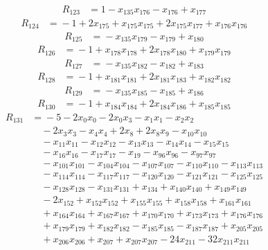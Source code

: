 \begin{align*}
R_{123}&={}1 -x_{135}x_{176} -x_{176} +x_{177}
\end{align*}
\begin{align*}
R_{124}&={}-1 +2x_{175} +x_{175}x_{175} +2x_{175}x_{177} +x_{176}x_{176}
\end{align*}
\begin{align*}
R_{125}&={}-x_{135}x_{179} -x_{179} +x_{180}
\end{align*}
\begin{align*}
R_{126}&={}-1 +x_{178}x_{178} +2x_{178}x_{180} +x_{179}x_{179}
\end{align*}
\begin{align*}
R_{127}&={}-x_{135}x_{182} -x_{182} +x_{183}
\end{align*}
\begin{align*}
R_{128}&={}-1 +x_{181}x_{181} +2x_{181}x_{183} +x_{182}x_{182}
\end{align*}
\begin{align*}
R_{129}&={}-x_{135}x_{185} -x_{185} +x_{186}
\end{align*}
\begin{align*}
R_{130}&={}-1 +x_{184}x_{184} +2x_{184}x_{186} +x_{185}x_{185}
\end{align*}
\begin{align*}
R_{131}&={}-5 -2x_{0}x_{0} -2x_{0}x_{3} -x_{1}x_{1} -x_{2}x_{2}\\
&\quad{}-2x_{3}x_{3} -x_{4}x_{4} +2x_{8} +2x_{8}x_{9} -x_{10}x_{10}\\
&\quad{}-x_{11}x_{11} -x_{12}x_{12} -x_{13}x_{13} -x_{14}x_{14} -x_{15}x_{15}\\
&\quad{}-x_{16}x_{16} -x_{17}x_{17} -x_{19} -x_{96}x_{96} -x_{97}x_{97}\\
&\quad{}-x_{101}x_{101} -x_{104}x_{104} -x_{107}x_{107} -x_{110}x_{110} -x_{113}x_{113}\\
&\quad{}-x_{114}x_{114} -x_{117}x_{117} -x_{120}x_{120} -x_{121}x_{121} -x_{125}x_{125}\\
&\quad{}-x_{128}x_{128} -x_{131}x_{131} +x_{134} +x_{140}x_{140} +x_{149}x_{149}\\
&\quad{}-2x_{152} +x_{152}x_{152} +x_{155}x_{155} +x_{158}x_{158} +x_{161}x_{161}\\
&\quad{}+x_{164}x_{164} +x_{167}x_{167} +x_{170}x_{170} +x_{173}x_{173} +x_{176}x_{176}\\
&\quad{}+x_{179}x_{179} +x_{182}x_{182} -x_{185}x_{185} -x_{187}x_{187} +x_{205}x_{205}\\
&\quad{}+x_{206}x_{206} +x_{207} +x_{207}x_{207} -24x_{211} -32x_{211}x_{211}
\end{align*}

